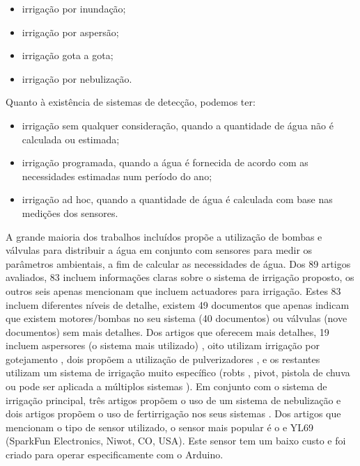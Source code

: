 \documentclass[conference]{IEEEtran}
\begin{document}
\begin{itemize}
\item irrigação por inundação;
\item irrigação por aspersão;
\item irrigação gota a gota;
\item irrigação por nebulização.
\end{itemize}

Quanto à existência de sistemas de detecção, podemos ter:

\begin{itemize}
\item irrigação sem qualquer consideração, quando a quantidade de água não é calculada ou estimada;
\item irrigação programada, quando a água é fornecida de acordo com as necessidades estimadas num período do ano;
\item irrigação ad hoc, quando a quantidade de água é calculada com base nas medições dos sensores.
\end{itemize}

A grande maioria dos trabalhos incluídos propõe a utilização de 
bombas e válvulas para distribuir a água em conjunto com sensores para medir os 
parâmetros ambientais, a fim de calcular as necessidades de água. Dos 89 
artigos avaliados, 83 incluem informações claras sobre o 
sistema de irrigação proposto, os outros seis apenas mencionam que incluem 
actuadores para irrigação. Estes 83 incluem diferentes níveis 
de detalhe, existem 49 documentos que apenas indicam que existem motores/bombas 
no seu sistema (40 documentos) ou válvulas (nove documentos) sem mais detalhes. 
Dos artigos que oferecem mais detalhes, 19 incluem aspersores (o sistema 
mais utilizado) \cite{gonzalez2018iot, ahmed2016intelligation, yusuf2005information, cambra2017iot, arvind2017automated, ammour2018factory, singh2019iot, wu2016secure, solanki2017conceptual, wasson2017integration, johar2018iot, ryu2015design, reche2014smart, chieochan2017internet, arumugam2018internet, boonchieng2018smart, rawal2017iot, guo2015design, khattab2016design}, 
oito utilizam irrigação por gotejamento \cite{daskalakis2018uw, nawandar2019iot, barkunan2019smart, sivaprasath2016arduino, kumar2017internet, kodali2016iot, abidin2015web, banumathi2017android}, dois propõem a 
utilização de pulverizadores \cite{mechsy2017mobile}, e os restantes utilizam 
um sistema de irrigação muito específico (robts \cite{rahul2018iot}, pivot, 
pistola de chuva \cite{vasu2017intelligent} ou pode ser aplicada a múltiplos 
sistemas \cite{agale2017automated}). Em conjunto com o sistema de irrigação principal, 
três artigos propõem o uso de um sistema de nebulização \cite{chieochan2017internet, boonchieng2018smart, kodali2016iot} e dois artigos 
propõem o uso de fertirrigação nos seus sistemas \cite{arumugam2018internet, abidin2015web}.
Dos artigos que mencionam o tipo de sensor utilizado, o sensor mais popular é o 
e YL69 (SparkFun Electronics, Niwot, CO, USA). Este sensor tem um baixo custo e 
foi criado para operar especificamente com o Arduino. \cite{garcia2020iot}
\end{document}
